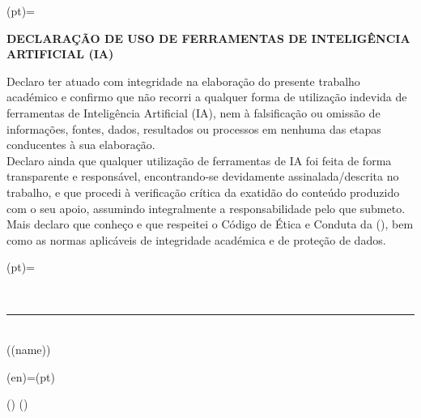 \SetStatementOfAIUsage(pt)={%
  \begin{center}%
    \textbf{DECLARAÇÃO DE USO DE FERRAMENTAS DE INTELIGÊNCIA ARTIFICIAL (IA)}%
  \end{center}%
    \indent Declaro ter atuado com integridade na elaboração do presente trabalho académico e confirmo que não recorri a qualquer forma de utilização indevida de ferramentas de Inteligência Artificial (IA), nem à falsificação ou omissão de informações, fontes, dados, resultados ou processos em nenhuma das etapas conducentes à sua elaboração.\\[1ex]
    \indent Declaro ainda que qualquer utilização de ferramentas de IA foi feita de forma transparente e responsável, encontrando-se devidamente assinalada/descrita no trabalho, e que procedi à verificação crítica da exatidão do conteúdo produzido com o seu apoio, assumindo integralmente a responsabilidade pelo que submeto.\\[1ex]
    \indent Mais declaro que conheço e que respeitei o Código de Ética e Conduta da \GetUniversity(\@LANG@MAIN), bem como as normas aplicáveis de integridade académica e de proteção de dados.
}



\SetSignatureLine(pt)={%
  \\[2cm]%
  \begin{center}%
    \rule{25em}{0.5pt}\\[-1ex]%
    (\GetDocAuthor(name))%
  \end{center}%
}

\SetSignatureLine(en)={\GetSignatureLine(pt)}




\thispagestyle{plain}%

\null%
\vfill%
\GetStatementOfIntegrityTextStr(\@LANG@MAIN)%
\vfill%
\GetStatementOfAIUsage(\@LANG@MAIN)%
\vfill%
%
\vfill%
